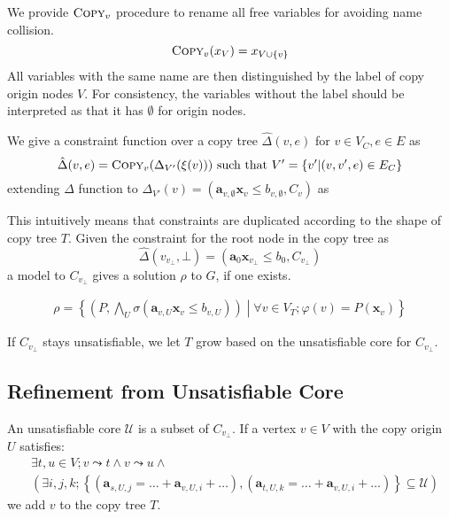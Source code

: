 \documentclass[a4paper,12pt]{article}
\begin{document}
We provide $\textsc{Copy}_v$ procedure to rename all free variables
for avoiding name collision.
\[ \textsc{Copy}_v (x_V) = x_{V \cup \left\lbrace v \right\rbrace} \]
All variables with the same name are then distinguished by the label
of copy origin nodes $V$. For consistency, the variables without the
label should be interpreted as that it has $\emptyset$ for origin
nodes.

We give a constraint function over a copy tree
$\hat \Delta(v,e)$ for $v \in V_C, e \in E$ as
\[ \hat \Delta (v,e) = \textsc{Copy}_v (\Delta_{V'} (\xi (v)))
\text{ such that } V' = \left\lbrace v' \middle| (v, v',e) \in E_C \right\rbrace \]
extending $\Delta$ function to
$\Delta_{V'} (v) = (\mathbf{a}_{v,\emptyset} \mathbf{x}_v \leq b_{v,\emptyset}, C_v)$
as


This intuitively means that constraints are duplicated according to
the shape of copy tree $T$.  Given the constraint for the root node in
the copy tree as
\[ \hat \Delta (v_{v_\bot}, \bot) = (\mathbf{a}_0 \mathbf{x}_{v_\bot} \leq b_0, C_{v_\bot}) \]
a model to $C_{v_\bot}$ gives a solution $\rho$ to $G$, if one exists.

\begin{align*}
 \rho = \left\lbrace
  \left( P, \bigwedge_U \sigma(\mathbf{a}_{v,U} \mathbf{x}_v \leq b_{v,U}) \right) \middle|
  \forall v \in V_T; \varphi(v) = P(\mathbf{x}_v)
 \right\rbrace
\end{align*}

If $C_{v_\bot}$ stays unsatisfiable, we let $T$ grow based on the
unsatisfiable core for $C_{v_\bot}$.

\subsection{Refinement from Unsatisfiable Core}

An unsatisfiable core $\mathcal{U}$ is a subset of $C_{v_\bot}$.
If a vertex $v \in V$ with the copy origin $U$ satisfies:
\begin{align*}
& \exists t, u \in V; v \leadsto t \wedge v \leadsto u \wedge \\
& \left( \exists i, j, k;
\left\lbrace \left( \mathbf{a}_{s,U,j} = \ldots + \mathbf{a}_{v,U,i} + \ldots \right),
\left( \mathbf{a}_{t,U,k} = \ldots + \mathbf{a}_{v,U,i} + \ldots \right)
\right\rbrace \subseteq \mathcal{U} \right)
\end{align*}
we add $v$ to the copy tree $T$.






\end{document}
